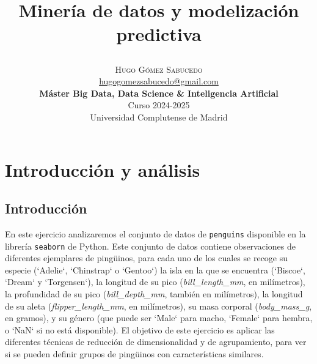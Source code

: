 \documentclass[a4paper,onecolumn]{extarticle}
\title{\begin{center} \Huge Minería de datos y modelización predictiva \end{center}} %
\author{
    \textsc{\Huge Hugo Gómez Sabucedo} \\ %
    \large \href{mailto:hugogomezsabucedo@gmail.com}{hugogomezsabucedo@gmail.com} \\ [2ex] %
    \Large \textbf{Máster Big Data, Data Science \& Inteligencia Artificial} \\
    \normalsize Curso 2024-2025 \\
    \large Universidad Complutense de Madrid
}
\date{} %
\let\stdsection\section
\renewcommand\section{\newpage\stdsection}
\begin{document}
\maketitle
\tableofcontents
\begin{sloppypar}


\section{Introducción y análisis} \label{introduccion}
\subsection{Introducción} \label{intro}
En este ejercicio analizaremos el conjunto de datos de \texttt{penguins} disponible en la librería \texttt{seaborn} de Python. Este conjunto de datos contiene
observaciones de diferentes ejemplares de pingüinos, para cada uno de los cuales se recoge su especie (`Adelie`, `Chinstrap` o `Gentoo`) la isla en la que se 
encuentra (`Biscoe`, `Dream` y `Torgensen`), la longitud de su pico (\textit{bill\_length\_mm}, en milímetros), la profundidad de su pico 
(\textit{bill\_depth\_mm}, también en milímetros), la longitud de su aleta (\textit{flipper\_length\_mm}, en milímetros), su masa corporal 
(\textit{body\_mass\_g}, en gramos), y su género (que puede ser `Male` para macho, `Female` para hembra, o `NaN` si no está disponible). El objetivo de este 
ejercicio es aplicar las diferentes técnicas de reducción de dimensionalidad y de agrupamiento, para ver si se pueden definir grupos de pingüinos con 
características similares.


\end{sloppypar}
\end{document}
